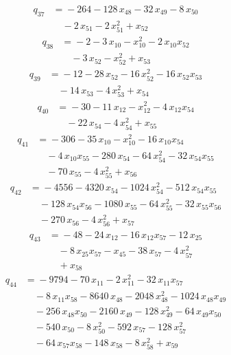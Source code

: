 \begin{align*}
q_{37} &={}-264 -128\,x_{48} -32\,x_{49} -8\,x_{50}\\
&\quad -2\,x_{51} -2\,x_{51}^{2} +x_{52}
\end{align*}
\begin{align*}
q_{38} &={}-2 -3\,x_{10} -x_{10}^{2} -2\,x_{10}x_{52}\\
&\quad -3\,x_{52} -x_{52}^{2} +x_{53}
\end{align*}
\begin{align*}
q_{39} &={}-12 -28\,x_{52} -16\,x_{52}^{2} -16\,x_{52}x_{53}\\
&\quad -14\,x_{53} -4\,x_{53}^{2} +x_{54}
\end{align*}
\begin{align*}
q_{40} &={}-30 -11\,x_{12} -x_{12}^{2} -4\,x_{12}x_{54}\\
&\quad -22\,x_{54} -4\,x_{54}^{2} +x_{55}
\end{align*}
\begin{align*}
q_{41} &={}-306 -35\,x_{10} -x_{10}^{2} -16\,x_{10}x_{54}\\
&\quad -4\,x_{10}x_{55} -280\,x_{54} -64\,x_{54}^{2} -32\,x_{54}x_{55}\\
&\quad -70\,x_{55} -4\,x_{55}^{2} +x_{56}
\end{align*}
\begin{align*}
q_{42} &={}-4556 -4320\,x_{54} -1024\,x_{54}^{2} -512\,x_{54}x_{55}\\
&\quad -128\,x_{54}x_{56} -1080\,x_{55} -64\,x_{55}^{2} -32\,x_{55}x_{56}\\
&\quad -270\,x_{56} -4\,x_{56}^{2} +x_{57}
\end{align*}
\begin{align*}
q_{43} &={}-48 -24\,x_{12} -16\,x_{12}x_{57} -12\,x_{25}\\
&\quad -8\,x_{25}x_{57} -x_{45} -38\,x_{57} -4\,x_{57}^{2}\\
&\quad +x_{58}
\end{align*}
\begin{align*}
q_{44} &={}-9794 -70\,x_{11} -2\,x_{11}^{2} -32\,x_{11}x_{57}\\
&\quad -8\,x_{11}x_{58} -8640\,x_{48} -2048\,x_{48}^{2} -1024\,x_{48}x_{49}\\
&\quad -256\,x_{48}x_{50} -2160\,x_{49} -128\,x_{49}^{2} -64\,x_{49}x_{50}\\
&\quad -540\,x_{50} -8\,x_{50}^{2} -592\,x_{57} -128\,x_{57}^{2}\\
&\quad -64\,x_{57}x_{58} -148\,x_{58} -8\,x_{58}^{2} +x_{59}
\end{align*}
